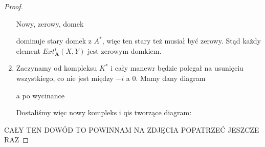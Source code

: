 \begin{proof}
\begin{enumerate}[label=(\alph*)]
      Nowy, zerowy, domek 
      \begin{center}\end{center}
      dominuje stary domek z $A^*$, więc ten stary też musiał być zerowy. Stąd każdy element $Ext^i_{\mathbf{A}}(X, Y)$ jest zerowym domkiem.
    
    \setcounter{enumi}{0}
    \item Zaczynamy od kompleksu $K^*$ i cały manewr będzie polegał na usunięciu wszystkiego, co nie jest między $-i$ a $0$. Mamy dany diagram
      \begin{center}\end{center}
      a po wycinance
      \begin{center}\end{center}
      Dostaliśmy więc nowy kompleks i qis tworzące diagram:
      \begin{center}\end{center}
  \end{enumerate}

  {\large\color{red}CAŁY TEN DOWÓD TO POWINNAM NA ZDJĘCIA POPATRZEĆ JESZCZE RAZ}
\end{proof}

